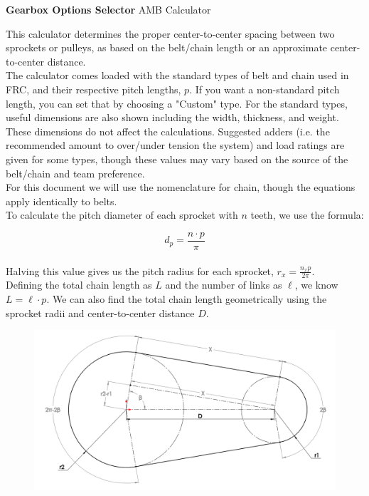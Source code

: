 \documentclass[a4paper]{article}
\begin{document}
	
	\Huge\textbf{Gearbox Options Selector}
	\newline
	\LARGE AMB Calculator
	
	\vspace{0.5cm}
	\normalsize
	
	This calculator determines the proper center-to-center spacing between two sprockets or pulleys, as based on the belt/chain length or an approximate center-to-center distance.\\
	
	The calculator comes loaded with the standard types of belt and chain used in FRC, and their respective pitch lengths, $ p $. If you want a non-standard pitch length, you can set that by choosing a "Custom" type. For the standard types, useful dimensions are also shown including the width, thickness, and weight. These dimensions do not affect the calculations. Suggested adders (i.e. the recommended amount to over/under tension the system) and load ratings are given for some types, though these values may vary based on the source of the belt/chain and team preference.\\
	
	For this document we will use the nomenclature for chain, though the equations apply identically to belts.\\
	
	To calculate the pitch diameter of each sprocket with $ n $ teeth, we use the formula:
	
	\begin{equation}
		d_p = \frac{n \cdot p}{\pi}
	\end{equation}\\
	
	Halving this value gives us the pitch radius for each sprocket, $ r_x = \frac{n_x p}{2\pi} $.\\
	
	Defining the total chain length as $ L $ and the number of links as $ \ell $, we know $ L = \ell \cdot p $. We can also find the total chain length geometrically using the sprocket radii and center-to-center distance $ D $.
	
	\begin{figure}[H]
		\centering
		\includegraphics[width=0.9\linewidth]{../img/equations_chain}
	\end{figure}
\end{document}
